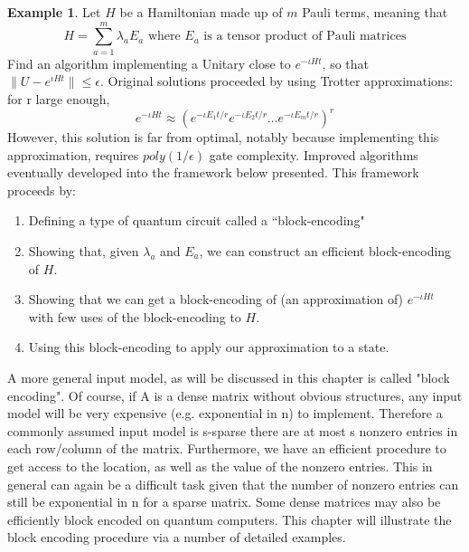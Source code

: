 \documentclass[12pt, oneside]{book}
\theoremstyle{definition}
\theoremstyle{definition}
\newtheorem{example}{Example}[section]
\theoremstyle{remark}
\begin{document}
\begin{example}
Let $H$ be a Hamiltonian made up of $m$ Pauli terms, meaning that
\[
H=\sum_{a=1}^m \lambda_a E_a \text{ where $E_a$ is a tensor product of Pauli matrices}
\]
Find an algorithm implementing a Unitary close to $e^{-\iota Ht}$, so that $\|U-e^{\iota Ht}\|\leq \epsilon$.
Original solutions proceeded by using Trotter approximations: for r large enough,
\[
e^{-\iota Ht}\approx (e^{-\iota E_1t/r} e^{-\iota E_2t/r } \ldots e^{-\iota E_mt/r })^r
\]
However, this solution is far from optimal, notably because implementing this approximation, requires $poly(1/\epsilon)$ gate complexity. Improved algorithms eventually developed into the framework below presented. This framework proceeds by:
\begin{enumerate}
    \item Defining a type of quantum circuit called a ``block-encoding"
    \item Showing that, given $\lambda_a$ and $E_a$, we can construct an efficient block-encoding of $H$.
    \item Showing that we can get a block-encoding of (an approximation of) $e^{-\iota Ht}$ with few uses of the block-encoding to $H$.
    \item Using this block-encoding to apply our approximation to a state.
\end{enumerate}
A more general input model, as will be discussed in this chapter is called "block encoding". Of course, if A is a dense matrix without obvious structures, any input model will be very expensive (e.g. exponential in n) to implement. Therefore a commonly assumed input model is s-sparse there are at most s nonzero entries in each row/column of the matrix. Furthermore, we have an efficient procedure to get access to the location, as well as the value of the nonzero entries. This in general can again be a difficult task given that the number of nonzero entries can still be exponential in n for a sparse matrix. Some dense matrices may also be efficiently block encoded on quantum computers. This chapter will illustrate the block encoding procedure via a number of detailed examples.
\end{example}
\end{document}

